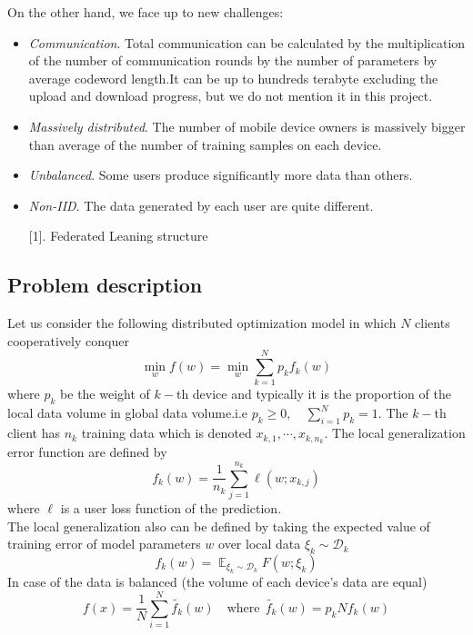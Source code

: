 \documentclass{article}
\DeclareMathOperator{\E}{\mathbb{E}}
\theoremstyle{theorem}
\theoremstyle{definition}
\begin{document}
	On the other hand, we face up to new challenges: \begin{itemize}
		\item \textit{Communication}.  Total communication can be calculated by the multiplication of the number of communication rounds by the number of parameters by average codeword length.It can be up to hundreds terabyte excluding the upload and download progress, but we do not mention it in this project. 
		\item \textit{Massively distributed}. The number of mobile device owners is massively bigger than average of the number of training samples on each device.
		\item \textit{Unbalanced}. Some users produce significantly more data than others.
		\item \textit{Non-IID}.	The data generated by each user are quite different.
	
\begin{center}
\begin{center}
	\figurename[1]{. Federated Leaning structure}
\end{center}
\end{center}		
	\end{itemize}
	\subsection{Problem description}
	Let us consider the following distributed optimization model in which $N$ clients cooperatively conquer   $$\min_{w} f(w) = \min_{w} \sum_{k=1}^{N} p_k f_k(w)$$
	where $p_k$ be the weight of $k-$th device and typically it is the proportion of the local data volume in global data volume.i.e $p_k \ge 0, \quad  \sum_{i=1}^{N}p_k=1.$ The $k-$th client has $n_k$ training data which is denoted $x_{k,1} , \cdots,  x_{k,n_k}.$ The local generalization error function are defined by $$f_k(w)= \frac{1}{n_k} \sum_{j=1}^{n_k} \ell (w;x_{k,j})$$
	where $\ell$ is a user loss function of the prediction.\\
	The local generalization also can be defined by taking the expected value of training error of model parameters $w$ over local data $\xi_k \sim \mathcal{D}_k$ $$f_k(w)=\E_{\xi_k \sim \mathcal{D}_k} F(w; \xi_k)$$
	In case of the data is balanced (the volume of each device's data are equal) $$f(x)=\frac{1}{N}  \sum_{i=1}^{N} \tilde{f_k}(w) \quad \text{where} \ \ \tilde{f_k}(w) =p_kNf_k(w)$$
\end{document}
